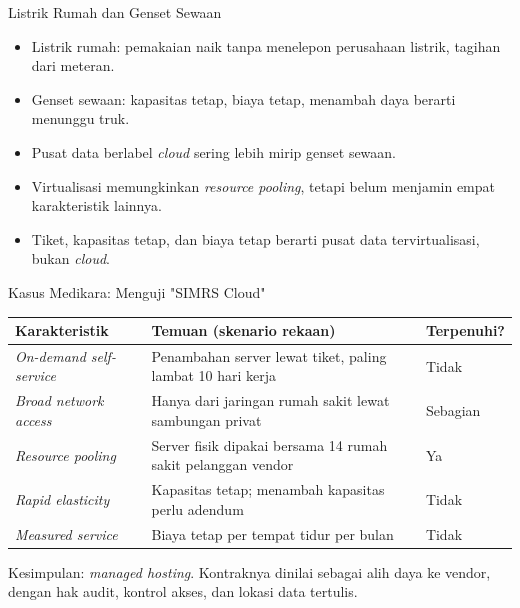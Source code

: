 \documentclass[aspectratio=169, table, 12pt]{beamer}
\begin{document}
\begin{frame}{Listrik Rumah dan Genset Sewaan}
  \small
  \begin{itemize}
    \item Listrik rumah: pemakaian naik tanpa menelepon perusahaan listrik, tagihan dari
          meteran.
    \item Genset sewaan: kapasitas tetap, biaya tetap, menambah daya berarti menunggu truk.
    \item Pusat data berlabel \textit{cloud} sering lebih mirip genset sewaan.
    \item Virtualisasi memungkinkan \textit{resource pooling}, tetapi belum menjamin empat
          karakteristik lainnya.
    \item Tiket, kapasitas tetap, dan biaya tetap berarti pusat data tervirtualisasi, bukan
          \textit{cloud}.
  \end{itemize}
\end{frame}

\begin{frame}{Kasus Medikara: Menguji "SIMRS Cloud"}
  \footnotesize
  \begin{tabularx}{\textwidth}{>{\raggedright\arraybackslash}p{3.4cm}
      >{\raggedright\arraybackslash}X >{\raggedright\arraybackslash}p{1.8cm}}
    \hline
    \textbf{Karakteristik} & \textbf{Temuan (skenario rekaan)} & \textbf{Terpenuhi?} \\
    \hline
    \textit{On-demand self-service} & Penambahan server lewat tiket, paling lambat 10 hari
      kerja & Tidak \\
    \hline
    \textit{Broad network access} & Hanya dari jaringan rumah sakit lewat sambungan privat &
      Sebagian \\
    \hline
    \textit{Resource pooling} & Server fisik dipakai bersama 14 rumah sakit pelanggan vendor
      & Ya \\
    \hline
    \textit{Rapid elasticity} & Kapasitas tetap; menambah kapasitas perlu adendum & Tidak \\
    \hline
    \textit{Measured service} & Biaya tetap per tempat tidur per bulan & Tidak \\
    \hline
  \end{tabularx}

  \vspace{8pt}
  \small Kesimpulan: \textit{managed hosting}. Kontraknya dinilai sebagai alih daya ke
  vendor, dengan hak audit, kontrol akses, dan lokasi data tertulis.
\end{frame}
\end{document}
